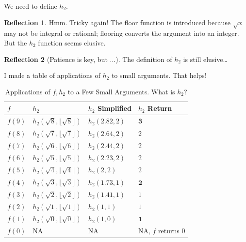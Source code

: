 \documentclass[11pt]{book}
\theoremstyle{definition}
\theoremstyle{plain}
\theoremstyle{problemstyle}
\theoremstyle{remark}
\theoremstyle{definition}
\newtheorem{reflection}{Reflection}
\begin{document}
We need to define $h_2$.

\begin{reflection}
    Hmm. Tricky again! The floor function is introduced because $\sqrt{x}$ may not be integral or rational; flooring converts the argument into an integer. But the $h_2$ function seems elusive.
\end{reflection}
\begin{reflection}[Patience is key, but ...]
    The definition of $h_2$ is still elusive\dots

    I made a table of applications of $h_2$ to small arguments. That helps!
\begin{table}[H]
  \begin{center}
    \caption{Applications of $f,h_2$ to a Few Small Arguments. What is $h_2$?}
    \label{tab:floor-root-x}
    \begin{tabular}{|l|l|l|l|} 
      \hline
        \textbf{$f$} & \textbf{$h_2$} & \textbf{$h_2$ Simplified} & \textbf{$h_2$ Return}\\
      \hline
        $f(9)$ & $h_2(\sqrt{8},\lfloor\sqrt{8}\rfloor)$ & $h_2(2.82, 2)$ & $\boldsymbol{3}$\\
      \hline
        $f(8)$ & $h_2(\sqrt{7},\lfloor\sqrt{7}\rfloor)$ & $h_2(2.64, 2)$ & $2$\\
      \hline
        $f(7)$ & $h_2(\sqrt{6},\lfloor\sqrt{6}\rfloor)$ & $h_2(2.44, 2)$ & $2$\\
      \hline
        $f(6)$ & $h_2(\sqrt{5},\lfloor\sqrt{5}\rfloor)$ & $h_2(2.23, 2)$ & $2$\\
      \hline
        $f(5)$ & $h_2(\sqrt{4},\lfloor\sqrt{4}\rfloor)$ & $h_2(2, 2)$ & $2$\\
      \hline
        $f(4)$ & $h_2(\sqrt{3},\lfloor\sqrt{3}\rfloor)$ & $h_2(1.73, 1)$ & $\boldsymbol{2}$\\
      \hline
        $f(3)$ & $h_2(\sqrt{2},\lfloor\sqrt{2}\rfloor)$ & $h_2(1.41, 1)$ & $1$\\
      \hline
        $f(2)$ & $h_2(\sqrt{1},\lfloor\sqrt{1}\rfloor)$ & $h_2(1, 1)$ & $1$\\
      \hline
        $f(1)$ & $h_2(\sqrt{0},\lfloor\sqrt{0}\rfloor)$ & $h_2(1, 0)$ & $\boldsymbol{1}$\\
      \hline
        $f(0)$ & NA & NA & NA, $f$ returns $0$\\
      \hline
    \end{tabular}
  \end{center}
\end{table}


\end{reflection}
\end{document}

